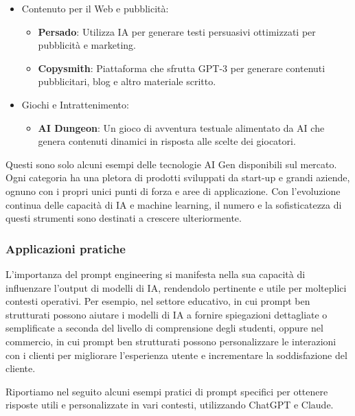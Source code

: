 \begin{itemize}
\begin{itemize}
            \end{itemize}
            \item Contenuto per il Web e pubblicità:
            \begin{itemize}
                \item \textbf{Persado}: Utilizza IA per generare testi persuasivi ottimizzati per pubblicità e marketing.
                \item \textbf{Copysmith}: Piattaforma che sfrutta GPT-3 per generare contenuti pubblicitari, blog e altro materiale scritto.
            \end{itemize}
            \item Giochi e Intrattenimento:
            \begin{itemize}
                \item \textbf{AI Dungeon}: Un gioco di avventura testuale alimentato da AI che genera contenuti dinamici in risposta alle scelte dei giocatori.
            \end{itemize}
        \end{itemize}

        Questi sono solo alcuni esempi delle tecnologie AI Gen disponibili sul mercato. Ogni categoria ha una pletora di prodotti sviluppati da start-up e grandi aziende, ognuno con i propri unici punti di forza e aree di applicazione. Con l'evoluzione continua delle capacità di IA e machine learning, il numero e la sofisticatezza di questi strumenti sono destinati a crescere ulteriormente.
    
        \subsubsection{Applicazioni pratiche}
            L'importanza del prompt engineering si manifesta nella sua capacità di influenzare l'output di modelli di IA, rendendolo pertinente e utile per molteplici contesti operativi. Per esempio, nel settore educativo, in cui prompt ben strutturati possono aiutare i modelli di IA a fornire spiegazioni dettagliate o semplificate a seconda del livello di comprensione degli studenti, oppure nel commercio, in cui prompt ben strutturati possono personalizzare le interazioni con i clienti per migliorare l'esperienza utente e incrementare la soddisfazione del cliente.

            Riportiamo nel seguito alcuni esempi pratici di prompt specifici per ottenere risposte utili e personalizzate in vari contesti, utilizzando ChatGPT e Claude.

